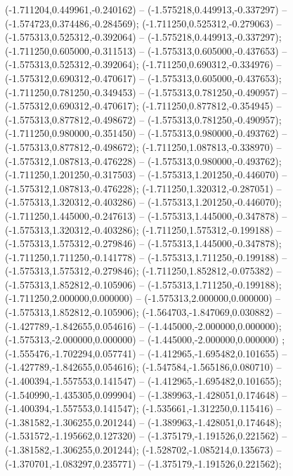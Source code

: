  (-1.711204,0.449961,-0.240162) -- (-1.575218,0.449913,-0.337297) -- (-1.574723,0.374486,-0.284569);
 (-1.711250,0.525312,-0.279063) -- (-1.575313,0.525312,-0.392064) -- (-1.575218,0.449913,-0.337297);
 (-1.711250,0.605000,-0.311513) -- (-1.575313,0.605000,-0.437653) -- (-1.575313,0.525312,-0.392064);
 (-1.711250,0.690312,-0.334976) -- (-1.575312,0.690312,-0.470617) -- (-1.575313,0.605000,-0.437653);
 (-1.711250,0.781250,-0.349453) -- (-1.575313,0.781250,-0.490957) -- (-1.575312,0.690312,-0.470617);
 (-1.711250,0.877812,-0.354945) -- (-1.575313,0.877812,-0.498672) -- (-1.575313,0.781250,-0.490957);
 (-1.711250,0.980000,-0.351450) -- (-1.575313,0.980000,-0.493762) -- (-1.575313,0.877812,-0.498672);
 (-1.711250,1.087813,-0.338970) -- (-1.575312,1.087813,-0.476228) -- (-1.575313,0.980000,-0.493762);
 (-1.711250,1.201250,-0.317503) -- (-1.575313,1.201250,-0.446070) -- (-1.575312,1.087813,-0.476228);
 (-1.711250,1.320312,-0.287051) -- (-1.575313,1.320312,-0.403286) -- (-1.575313,1.201250,-0.446070);
 (-1.711250,1.445000,-0.247613) -- (-1.575313,1.445000,-0.347878) -- (-1.575313,1.320312,-0.403286);
 (-1.711250,1.575312,-0.199188) -- (-1.575313,1.575312,-0.279846) -- (-1.575313,1.445000,-0.347878);
 (-1.711250,1.711250,-0.141778) -- (-1.575313,1.711250,-0.199188) -- (-1.575313,1.575312,-0.279846);
 (-1.711250,1.852812,-0.075382) -- (-1.575313,1.852812,-0.105906) -- (-1.575313,1.711250,-0.199188);
 (-1.711250,2.000000,0.000000) -- (-1.575313,2.000000,0.000000) -- (-1.575313,1.852812,-0.105906);
 (-1.564703,-1.847069,0.030882) -- (-1.427789,-1.842655,0.054616) -- (-1.445000,-2.000000,0.000000);
 (-1.575313,-2.000000,0.000000) -- (-1.445000,-2.000000,0.000000) ;
 (-1.555476,-1.702294,0.057741) -- (-1.412965,-1.695482,0.101655) -- (-1.427789,-1.842655,0.054616);
 (-1.547584,-1.565186,0.080710) -- (-1.400394,-1.557553,0.141547) -- (-1.412965,-1.695482,0.101655);
 (-1.540990,-1.435305,0.099904) -- (-1.389963,-1.428051,0.174648) -- (-1.400394,-1.557553,0.141547);
 (-1.535661,-1.312250,0.115416) -- (-1.381582,-1.306255,0.201244) -- (-1.389963,-1.428051,0.174648);
 (-1.531572,-1.195662,0.127320) -- (-1.375179,-1.191526,0.221562) -- (-1.381582,-1.306255,0.201244);
 (-1.528702,-1.085214,0.135673) -- (-1.370701,-1.083297,0.235771) -- (-1.375179,-1.191526,0.221562);
